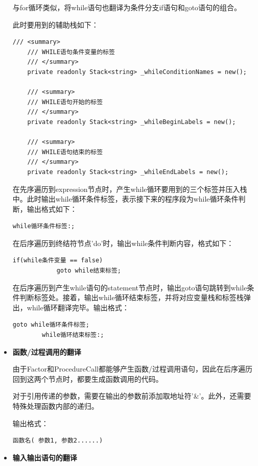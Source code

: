 \documentclass[../main.tex]{subfiles}
\begin{document}
\begin{itemize}
    与for循环类似，将while语句也翻译为条件分支if语句和goto语句的组合。

    此时要用到的辅助栈如下：
    \begin{lstlisting}[style = csharp]
    /// <summary>
    /// WHILE语句条件变量的标签
    /// </summary>
    private readonly Stack<string> _whileConditionNames = new();

    /// <summary>
    /// WHILE语句开始的标签
    /// </summary>
    private readonly Stack<string> _whileBeginLabels = new();

    /// <summary>
    /// WHILE语句结束的标签
    /// </summary>
    private readonly Stack<string> _whileEndLabels = new();    
    \end{lstlisting}

    在先序遍历到expression节点时，产生while循环要用到的三个标签并压入栈中。此时输出while循环条件标签，表示接下来的程序段为while循环条件判断，输出格式如下：
    \begin{lstlisting}[style = c]
        while循环条件标签:;    
    \end{lstlisting}

    在后序遍历到终结符节点'do'时，输出while条件判断内容，格式如下：
    \begin{lstlisting}[style = c]
        if(while条件变量 == false)
            goto while结束标签;
    \end{lstlisting}

    在后序遍历到产生while语句的statement节点时，输出goto语句跳转到while条件判断标签处。接着，输出while循环结束标签，并将对应变量栈和标签栈弹出，while循环翻译完毕。输出格式：
    \begin{lstlisting}[style = c]
        goto while循环条件标签;
        while循环结束标签:;
    \end{lstlisting}
    
    \item \textbf{函数/过程调用的翻译}
    
    由于Factor和ProcedureCall都能够产生函数/过程调用语句，因此在后序遍历回到这两个节点时，都要生成函数调用的代码。

    对于引用传递的参数，需要在输出的参数前添加取地址符'\&'。此外，还需要特殊处理函数内部的递归。

    输出格式：
    \begin{lstlisting}[style = c]
        函数名( 参数1, 参数2......)
    \end{lstlisting}

    \item \textbf{输入输出语句的翻译}


\end{itemize}
\end{document}
